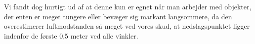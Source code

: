 Vi fandt dog hurtigt ud af at denne kun er egnet når man arbejder med objekter, der enten er meget tungere eller bevæger sig markant langsommere, da den overestimerer luftmodstanden så meget ved vores skud, at nedslagspunktet ligger indenfor de første 0,5 meter ved alle vinkler.


















